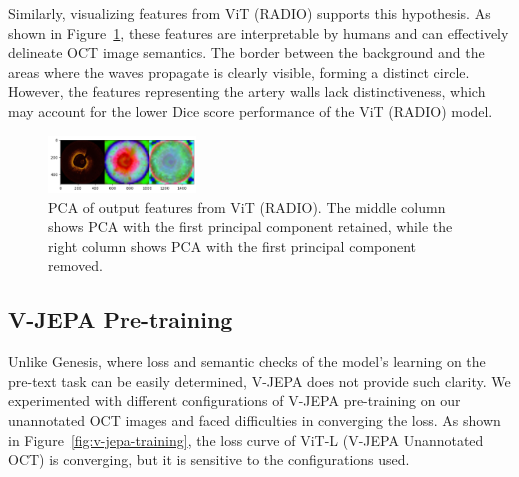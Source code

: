 \documentclass[a4paper,11pt,oneside]{report}
\begin{document}
 Similarly, visualizing features from ViT (RADIO) supports this hypothesis. As shown in Figure~\ref{fig:radio-features}, these features are interpretable by humans and can effectively delineate OCT image semantics. The border between the background and the areas where the waves propagate is clearly visible, forming a distinct circle. However, the features representing the artery walls lack distinctiveness, which may account for the lower Dice score performance of the ViT (RADIO) model.

\begin{figure}[hbt]
    \centering
    \includegraphics[width=0.35\textwidth]{figures/discussion_radio_feature.png}
    \caption{PCA of output features from ViT (RADIO). The middle column shows PCA with the first principal component retained, while the right column shows PCA with the first principal component removed.}
    \label{fig:radio-features}
\end{figure}

\subsection{V-JEPA Pre-training}
Unlike Genesis, where loss and semantic checks of the model's learning on the pre-text task can be easily determined, V-JEPA does not provide such clarity. We experimented with different configurations of V-JEPA pre-training on our unannotated OCT images and faced difficulties in converging the loss. As shown in Figure~\ref{fig:v-jepa-training}, the loss curve of ViT-L (V-JEPA Unannotated OCT) is converging, but it is sensitive to the configurations used.
\end{document}
